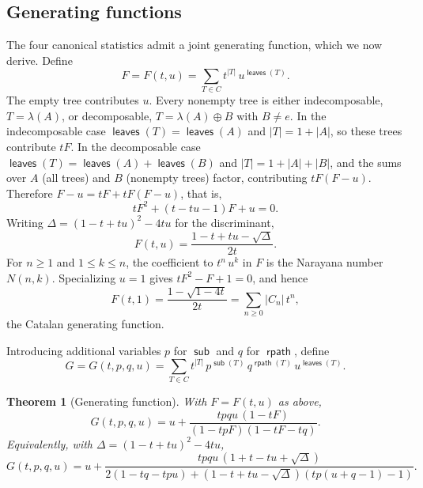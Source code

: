 \documentclass[a4paper,11pt]{article}
\newtheorem{theorem}{Theorem}[section]
\theoremstyle{definition}
\DeclareMathOperator{\rpath}{\mathsf{rpath}}
\DeclareMathOperator{\leaves}{\mathsf{leaves}}
\DeclareMathOperator{\subtrees}{\mathsf{sub}}
\begin{document}
\subsection{Generating functions}\label{sec:genfun}

The four canonical statistics admit a joint
generating function, which we now derive.
Define
\[
  F = F(t,u) = \sum_{T \in C} t^{|T|}\,
    u^{\leaves(T)}.
\]
The empty tree contributes $u$. Every nonempty tree
is either indecomposable, $T = \lambda(A)$, or decomposable,
$T = \lambda(A) \oplus B$ with $B \neq e$.
In the indecomposable case $\leaves(T) = \leaves(A)$ and
$|T| = 1 + |A|$, so these trees contribute $tF$.
In the decomposable case $\leaves(T) = \leaves(A) + \leaves(B)$
and $|T| = 1 + |A| + |B|$, and the sums over $A$ (all
trees) and $B$ (nonempty trees) factor, contributing
$tF(F - u)$. Therefore
$F - u = tF + tF(F - u)$, that is,\
\[
  tF^2 + (t - tu - 1)F + u = 0.
\]
Writing $\Delta = (1-t+tu)^2 - 4tu$ for the
discriminant,
\[
  F(t,u)
    = \frac{1 - t + tu - \sqrt{\Delta}}{2t}.
\]
For $n \geq 1$ and $1 \leq k \leq n$, the coefficient
to $t^n\, u^k$ in $F$ is the Narayana number $N(n,k)$.
Specializing $u = 1$ gives $tF^2 - F + 1 = 0$, and hence
\[
  F(t,1) = \frac{1 - \sqrt{1 - 4t}}{2t}
    = \sum_{n \geq 0} |C_n|\, t^n,
\]
the Catalan generating function.

Introducing additional variables $p$ for $\subtrees$ and $q$
for $\rpath$, define
\[
  G = G(t,p,q,u) = \sum_{T \in C} t^{|T|}\,
    p^{\subtrees(T)}\, q^{\rpath(T)}\,
    u^{\leaves(T)}.
\]

\begin{theorem}[Generating function]\label{thm:genfun}
With $F = F(t,u)$ as above,
\[
  G(t,p,q,u) = u +
    \frac{tpqu\,(1-tF)}{(1-tpF)(1-tF-tq)}.
\]
Equivalently, with
$\Delta = (1-t+tu)^2 - 4tu$,
\[
  G(t,p,q,u) = u +
    \frac{tpqu\,(1+t-tu+\sqrt{\Delta})}
    {2(1-tq-tpu)
      + (1-t+tu-\sqrt{\Delta})(tp(u+q-1)-1)}.
\]
\end{theorem}
\end{document}
